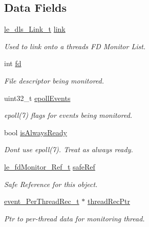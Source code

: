 \subsection*{Data Fields}
\begin{DoxyCompactItemize}
\item 
\hyperlink{structle__dls___link__t}{le\+\_\+dls\+\_\+\+Link\+\_\+t} \hyperlink{struct_fd_monitor__t_aea39e3924b8381f24652d4ed432d5d1e}{link}
\begin{DoxyCompactList}\small\item\em Used to link onto a thread\textquotesingle{}s FD Monitor List. \end{DoxyCompactList}\item 
int \hyperlink{struct_fd_monitor__t_a233a2a23638f13a928611ba36d048e2c}{fd}
\begin{DoxyCompactList}\small\item\em File descriptor being monitored. \end{DoxyCompactList}\item 
uint32\+\_\+t \hyperlink{struct_fd_monitor__t_ad12ec515b59a276c77b16fec3a131527}{epoll\+Events}
\begin{DoxyCompactList}\small\item\em epoll(7) flags for events being monitored. \end{DoxyCompactList}\item 
bool \hyperlink{struct_fd_monitor__t_a44f77038490b4159469a5f1622c8def0}{is\+Always\+Ready}
\begin{DoxyCompactList}\small\item\em Don\textquotesingle{}t use epoll(7). Treat as always ready. \end{DoxyCompactList}\item 
\hyperlink{le__fd_monitor_8h_a85048556f0b95147af81e76907895d42}{le\+\_\+fd\+Monitor\+\_\+\+Ref\+\_\+t} \hyperlink{struct_fd_monitor__t_aa12df9f2b06d5d406f127a01053edba2}{safe\+Ref}
\begin{DoxyCompactList}\small\item\em Safe Reference for this object. \end{DoxyCompactList}\item 
\hyperlink{structevent___per_thread_rec__t}{event\+\_\+\+Per\+Thread\+Rec\+\_\+t} $\ast$ \hyperlink{struct_fd_monitor__t_ad894493e157ee5a16026418dcd37d1f5}{thread\+Rec\+Ptr}
\begin{DoxyCompactList}\small\item\em Ptr to per-\/thread data for monitoring thread. \end{DoxyCompactList}\item 

\end{DoxyCompactItemize}
